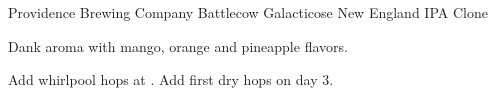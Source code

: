 \begin{recipe}{Providence Brewing Company Battlecow Galacticose New England IPA Clone}

\begin{aboutblock}
Dank aroma with mango, orange and pineapple flavors. \sourceaha
\end{aboutblock}


\begin{methodandtiming}
 
\begin{mashsteps}
\end{mashsteps}

\begin{fermentationsteps}
\end{fermentationsteps}

\begin{directions}
Add whirlpool hops at . Add first dry hops on day 3.
\end{directions}

\end{methodandtiming}

\recipebreak

\begin{ingredientsblock}

\begin{malts}
\end{malts}

\begin{hops}
\end{hops}


\end{ingredientsblock}

\end{recipe}

